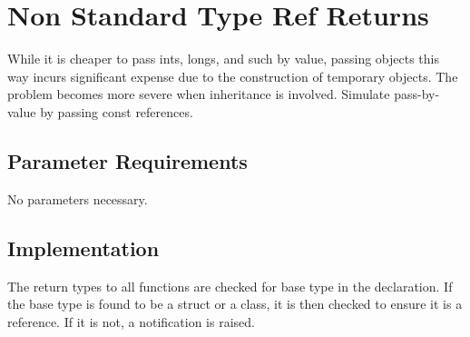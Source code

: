 %
%

\section{Non Standard Type Ref Returns}
\label{NonStandardTypeRefReturns::overview}
While it is cheaper to pass ints, longs, and such by value, passing
objects this way incurs significant expense due to the construction of
 temporary objects. The problem becomes more severe when inheritance
 is involved. Simulate pass-by-value by passing const references.

\subsection{Parameter Requirements}

No parameters necessary.

\subsection{Implementation}

The return types to all functions are checked for base type in the
declaration.  If the base type is found to be a struct or a class, it
is then checked to ensure it is a reference.  If it is not, a
notification is raised.


